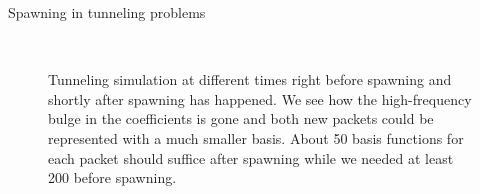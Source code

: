 \begin{chapter}{Spawning in tunneling problems}
\begin{figure}[h!]
  \centering
   \\
  \caption[Tunneling simulation at different times]{
  Tunneling simulation at different times right before spawning and shortly after spawning
  has happened. We see how the high-frequency bulge in the coefficients is gone
  and both new packets could be represented with a much smaller basis. About 50
  basis functions for each packet should suffice after spawning while we needed
  at least 200 before spawning.
  }
  \label{fig:spawning_propagation_intro2}
\end{figure}



\end{chapter}
